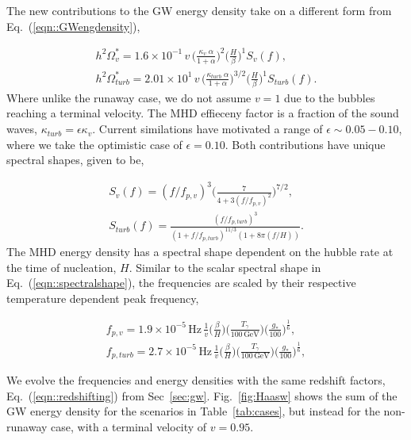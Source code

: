 \documentclass[nofootinbib,twocolumn,preprintnumbers]{revtex4-1}
\begin{document}
The new contributions to the GW energy density take on a different form from Eq.~(\ref{eqn::GWengdensity}),

\begin{equation}
\begin{split}
h^2\Omega_{v}^* = 1.6 \times 10^{-1} \, v  \, \bigg( \frac{\kappa_{v}\;  \alpha}{1 + \alpha} \bigg)^2 \bigg( \frac{H}{\beta} \bigg)^1  S_{v}(f),
\\
h^2\Omega_{turb}^* = 2.01\times 10^{1} \, v \, \bigg( \frac{\kappa_{turb} \; \alpha}{1 + \alpha} \bigg)^{3/2} \bigg( \frac{H}{\beta} \bigg)^1  S_{turb}(f).
\end{split}
\end{equation}
Where unlike the runaway case, we do not assume $v = 1$ due to the bubbles reaching a terminal velocity. The MHD effieceny factor is a fraction of the sound waves, $\kappa_{turb} = \epsilon\kappa_{v}$. Current similations have motivated a range of $\epsilon \sim 0.05 - 0.10$, where we take the optimistic case of $\epsilon = 0.10$. Both contributions have unique spectral shapes, given to be, 

\begin{equation}
\begin{split}
S_{v}(f) = (f/f_{p,v})^3\bigg(\frac{7}{4+3(f/f_{p,v})^2}\bigg)^{7/2},
\\
S_{turb}(f) = \frac{(f/f_{p,turb})^{3}}{(1 + f/f_{p,turb})^{11/3} (1 + 8\pi(f/H))}.
\end{split}
\end{equation}
The MHD energy density has a spectral shape dependent on the hubble rate at the time of nucleation, $H$.  Similar to the scalar spectral shape in Eq.~(\ref{eqn::spectralshape}), the frequencies are scaled by their respective temperature dependent peak frequency, 

\begin{equation}
\begin{split}
f_{p,v} = 1.9 \times 10^{-5} \, \textrm{Hz}\, \frac{1}{v} \bigg( \frac{\beta}{H}\bigg)\bigg(\frac{T_{\gamma}}{100 \, \textrm{GeV}}\bigg)\bigg(\frac{g_{*}}{100}\bigg)^{\frac{1}{6}},
\\
f_{p,turb} =  2.7 \times 10^{-5} \, \textrm{Hz}\, \frac{1}{v} \bigg( \frac{\beta}{H}\bigg)\bigg(\frac{T_{\gamma}}{100 \, \textrm{GeV}}\bigg)\bigg(\frac{g_{*}}{100}\bigg)^{\frac{1}{6}},
\end{split}
\end{equation}

We evolve the frequencies and energy densities with the same redshift factors, Eq.~(\ref{eqn::redshifting}) from Sec~\ref{sec:gw}. Fig.~\ref{fig:Haasw} shows the sum of the GW energy density for the scenarios in Table~\ref{tab:cases}, but instead for the non-runaway case, with a terminal velocity of $v = 0.95$.


\appendix


\end{document}
